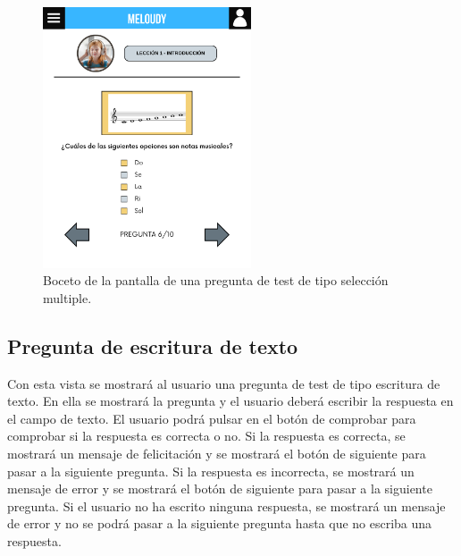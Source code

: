 \begin{figure}[H]
    \centering
    \centerline{\includegraphics[width=0.55\textwidth, frame]{imagenes/c6/6.png}}
    \caption{Boceto de la pantalla de una pregunta de test de tipo selección multiple.}
    \label{fig:seleccionmultiple}
\end{figure}

\newpage

\subsection*{Pregunta de escritura de texto}

Con esta vista se mostrará al usuario una pregunta de test de tipo escritura de texto. En ella se mostrará la pregunta y el usuario deberá escribir la respuesta en el campo de texto. El usuario podrá pulsar en el botón de comprobar para comprobar si la respuesta es correcta o no. Si la respuesta es correcta, se mostrará un mensaje de felicitación y se mostrará el botón de siguiente para pasar a la siguiente pregunta. Si la respuesta es incorrecta, se mostrará un mensaje de error y se mostrará el botón de siguiente para pasar a la siguiente pregunta. Si el usuario no ha escrito ninguna respuesta, se mostrará un mensaje de error y no se podrá pasar a la siguiente pregunta hasta que no escriba una respuesta.

